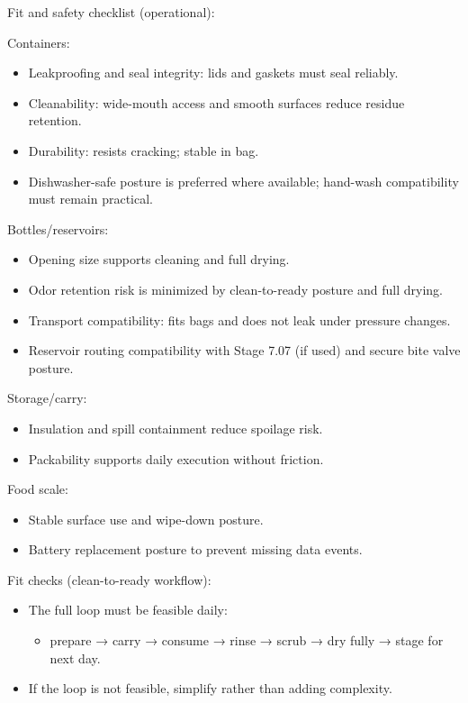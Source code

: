 \documentclass[10pt]{article}
\begin{document}
Fit and safety checklist (operational):

Containers:

\begin{itemize}
\item Leakproofing and seal integrity: lids and gaskets must seal reliably.
\item Cleanability: wide-mouth access and smooth surfaces reduce residue retention.
\item Durability: resists cracking; stable in bag.
\item Dishwasher-safe posture is preferred where available; hand-wash compatibility must remain practical.
\end{itemize}

Bottles/reservoirs:

\begin{itemize}
\item Opening size supports cleaning and full drying.
\item Odor retention risk is minimized by clean-to-ready posture and full drying.
\item Transport compatibility: fits bags and does not leak under pressure changes.
\item Reservoir routing compatibility with Stage 7.07 (if used) and secure bite valve posture.
\end{itemize}

Storage/carry:

\begin{itemize}
\item Insulation and spill containment reduce spoilage risk.
\item Packability supports daily execution without friction.
\end{itemize}

Food scale:

\begin{itemize}
\item Stable surface use and wipe-down posture.
\item Battery replacement posture to prevent missing data events.
\end{itemize}

Fit checks (clean-to-ready workflow):

\begin{itemize}
\item The full loop must be feasible daily:
  \begin{itemize}
  \item prepare → carry → consume → rinse → scrub → dry fully → stage for next day.
  \end{itemize}
\item If the loop is not feasible, simplify rather than adding complexity.
\end{itemize}
\end{document}
